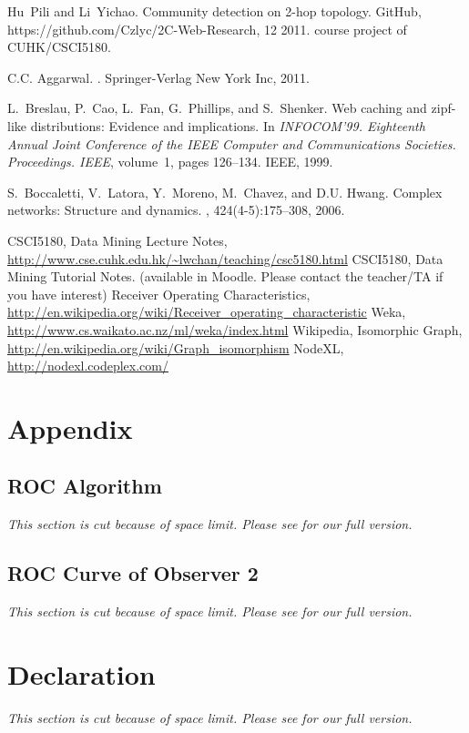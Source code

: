 \documentclass[11pt,a4paper]{article}
\begin{document}
\begin{thebibliography}{99}

Hu~Pili and Li~Yichao.
\newblock Community detection on 2-hop topology.
\newblock GitHub, https://github.com/Czlyc/2C-Web-Research, 12 2011.
\newblock course project of CUHK/CSCI5180.

C.C. Aggarwal.
.
\newblock Springer-Verlag New York Inc, 2011.

L.~Breslau, P.~Cao, L.~Fan, G.~Phillips, and S.~Shenker.
\newblock Web caching and zipf-like distributions: Evidence and implications.
\newblock In {\em INFOCOM'99. Eighteenth Annual Joint Conference of the IEEE
  Computer and Communications Societies. Proceedings. IEEE}, volume~1, pages
  126--134. IEEE, 1999.

S.~Boccaletti, V.~Latora, Y.~Moreno, M.~Chavez, and D.U. Hwang.
\newblock Complex networks: Structure and dynamics.
, 424(4-5):175--308, 2006.

	 CSCI5180, Data Mining Lecture Notes, 
		\url{http://www.cse.cuhk.edu.hk/~lwchan/teaching/csc5180.html}
	 CSCI5180, Data Mining Tutorial Notes. 
		(available in Moodle. Please contact the teacher/TA if you have 
		interest)
	 Receiver Operating Characteristics, 
		\url{http://en.wikipedia.org/wiki/Receiver_operating_characteristic}
	 Weka, 
		\url{http://www.cs.waikato.ac.nz/ml/weka/index.html}
	 Wikipedia, Isomorphic Graph, 
		\url{http://en.wikipedia.org/wiki/Graph_isomorphism}
	 NodeXL, 
		\url{http://nodexl.codeplex.com/}
\end{thebibliography}


\section*{Appendix}

\subsection*{ROC Algorithm}

\textit{This section is cut because of space limit. Please see \cite{hu2011-cd2hop}
for our full version. }

\subsection*{ROC Curve of Observer 2}

\textit{This section is cut because of space limit. Please see \cite{hu2011-cd2hop}
for our full version. }

\section*{Declaration}

\textit{This section is cut because of space limit. Please see \cite{hu2011-cd2hop}
for our full version. }
\end{document}
